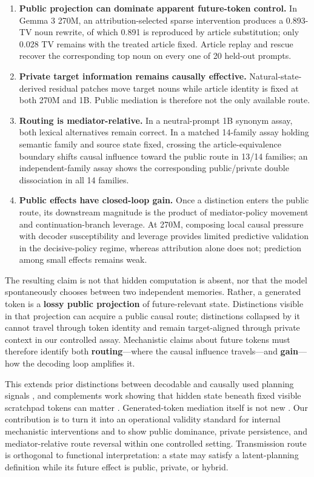 \documentclass[
]{article}
\providecommand{\tightlist}{%
  \setlength{\itemsep}{0pt}\setlength{\parskip}{0pt}}
\begin{document}
\begin{enumerate}
\def\labelenumi{\arabic{enumi}.}
\tightlist
\item
  \textbf{Public projection can dominate apparent future-token control.}
  In Gemma 3 270M, an attribution-selected sparse intervention produces
  a 0.893-TV noun rewrite, of which 0.891 is reproduced by article
  substitution; only 0.028 TV remains with the treated article fixed.
  Article replay and rescue recover the corresponding top noun on every
  one of 20 held-out prompts.
\item
  \textbf{Private target information remains causally effective.}
  Natural-state-derived residual patches move target nouns while article
  identity is fixed at both 270M and 1B. Public mediation is therefore
  not the only available route.
\item
  \textbf{Routing is mediator-relative.} In a neutral-prompt 1B synonym
  assay, both lexical alternatives remain correct. In a matched
  14-family assay holding semantic family and source state fixed,
  crossing the article-equivalence boundary shifts causal influence
  toward the public route in 13/14 families; an independent-family assay
  shows the corresponding public/private double dissociation in all 14
  families.
\item
  \textbf{Public effects have closed-loop gain.} Once a distinction
  enters the public route, its downstream magnitude is the product of
  mediator-policy movement and continuation-branch leverage. At 270M,
  composing local causal pressure with decoder susceptibility and
  leverage provides limited predictive validation in the decisive-policy
  regime, whereas attribution alone does not; prediction among small
  effects remains weak.
\end{enumerate}

The resulting claim is not that hidden computation is absent, nor that
the model spontaneously chooses between two independent memories.
Rather, a generated token is a \textbf{lossy public projection} of
future-relevant state. Distinctions visible in that projection can
acquire a public causal route; distinctions collapsed by it cannot
travel through token identity and remain target-aligned through private
context in our controlled assay. Mechanistic claims about future tokens
must therefore identify both \textbf{routing}---where the causal
influence travels---and \textbf{gain}---how the decoding loop amplifies
it.

This extends prior distinctions between decodable and causally used
planning signals \citep{ma2026plan}, and complements work showing that
hidden state beneath fixed visible scratchpad tokens can matter
\citep{shih2026registers}. Generated-token mediation itself is not new
\citep{vig2020mediation, paul2024reasoning}. Our contribution is to turn
it into an operational validity standard for internal mechanistic
interventions and to show public dominance, private persistence, and
mediator-relative route reversal within one controlled setting.
Transmission route is orthogonal to functional interpretation: a state
may satisfy a latent-planning definition while its future effect is
public, private, or hybrid.
\end{document}
